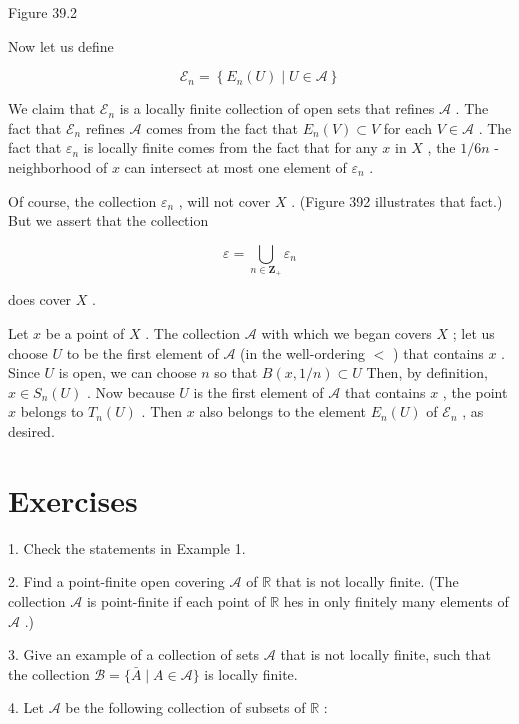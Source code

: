 \documentclass[10pt]{article}
\begin{document}
Figure 39.2

Now let us define

\[
{\mathcal{E}}_{n} = \left\{  {{E}_{n}\left( U\right)  \mid  U \in  \mathcal{A}}\right\}
\]

We claim that \({\mathcal{E}}_{n}\) is a locally finite collection of open sets that refines \(\mathcal{A}\) . The fact that \({\mathcal{E}}_{n}\) refines \(\mathcal{A}\) comes from the fact that \({E}_{n}\left( V\right)  \subset  V\) for each \(V \in  \mathcal{A}\) . The fact that \({\varepsilon }_{n}\) is locally finite comes from the fact that for any \(x\) in \(X\) , the \(1/{6n}\) -neighborhood of \(x\) can intersect at most one element of \({\varepsilon }_{n}\) .

Of course, the collection \({\varepsilon }_{n}\) , will not cover \(X\) . (Figure 392 illustrates that fact.) But we assert that the collection

\[
\varepsilon  = \mathop{\bigcup }\limits_{{n \in  {\mathbf{Z}}_{ + }}}{\varepsilon }_{n}
\]

does cover \(X\) .

Let \(x\) be a point of \(X\) . The collection \(\mathcal{A}\) with which we began covers \(X\) ; let us choose \(U\) to be the first element of \(\mathcal{A}\) (in the well-ordering \(<\) ) that contains \(x\) . Since \(U\) is open, we can choose \(n\) so that \(B\left( {x,1/n}\right)  \subset  U\) Then, by definition, \(x \in  {S}_{n}\left( U\right)\) . Now because \(U\) is the first element of \(\mathcal{A}\) that contains \(x\) , the point \(x\) belongs to \({T}_{n}\left( U\right)\) . Then \(x\) also belongs to the element \({E}_{n}\left( U\right)\) of \({\mathcal{E}}_{n}\) , as desired.

\section*{Exercises}

1. Check the statements in Example 1.

2. Find a point-finite open covering \(\mathcal{A}\) of \(\mathbb{R}\) that is not locally finite. (The collection \(\mathcal{A}\) is point-finite if each point of \(\mathbb{R}\) hes in only finitely many elements of \(\mathcal{A}\) .)

3. Give an example of a collection of sets \(\mathcal{A}\) that is not locally finite, such that the collection \(\mathcal{B} = \{ \bar{A} \mid  A \in  \mathcal{A}\}\) is locally finite.

4. Let \(\mathcal{A}\) be the following collection of subsets of \(\mathbb{R}\) :
\end{document}
